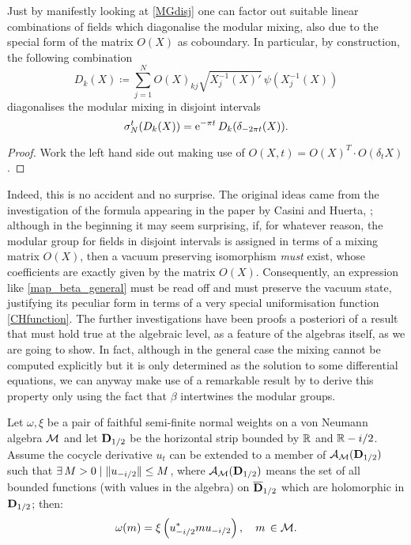 \begin{property}
Just by manifestly looking at \eqref{MGdisj} one can 
factor out suitable linear combinations of fields which 
diagonalise the modular mixing, also due to the special 
form of the matrix $O(X)$ as coboundary. In particular,
by construction, the following combination
\[
D_k(X)\coloneqq \sum_{j=1}^N O(X)_{kj}\sqrt{X_j^{-1}(X)'}\,
\psi(X_j^{-1}(X))
\]
diagonalises the modular mixing in disjoint intervals
\[
\sigma_N^t(D_k(X))=\operatorname{e}^{-\pi t}D_k(\delta_{-2\pi t}(X)).
\]
\end{property}
\begin{proof}
Work the left hand side out making use of 
$O(X,t)=O(X)^T\cdot O(\delta_t X)$.\qedhere
\end{proof}
Indeed, this is no accident and no surprise. The original 
ideas came from the investigation of the formula appearing
in the paper by Casini and Huerta, \cite{CH:2009}; 
although in the beginning it 
may seem surprising, if, for whatever reason, the modular 
group for fields in disjoint intervals is assigned in terms 
of a mixing matrix $O(X)$, then a vacuum preserving 
isomorphism \emph{must} exist, whose coefficients are exactly
given by the matrix $O(X)$. Consequently, an expression like 
\eqref{map_beta_general} must be read off and must preserve the 
vacuum state, justifying its peculiar form in terms of a 
very special uniformisation function \eqref{CHfunction}.
The further investigations have been proofs a posteriori of 
a result that must hold true at the algebraic level, as 
a feature of the algebras itself, as we are going to show.
In fact, although in the general case the mixing
cannot be computed explicitly but it is only determined as 
the solution to some differential equations, we can anyway 
make use of a remarkable result by 
\cite*{TAKII:2002} to derive this property only using the fact 
that $\beta$ intertwines the modular groups.
\begin{theorem}
\label{Tak3.17}
Let $\omega,\xi$ be a pair of faithful semi-finite normal weights 
on a von Neumann algebra $\mathcal{M}$ and let $\textrm{\bfseries{D}}_{1/2}$ 
be the horizontal strip bounded by $\mathbb{R}$ and $\mathbb{R}-i/2$.
Assume the cocycle derivative $u_t$ 
can be extended to a member of 
$\mathcal{A}_{\mathcal{M}}(\textrm{\bfseries{D}}_{1/2})$ 
such that $\exists\,M>0\mid \lVert u_{-i/2}\rVert\leq M$, where 
$\mathcal{A}_{\mathcal{M}}(\textrm{\bfseries{D}}_{1/2})$
means the set of all bounded functions (with values
in the algebra) on 
$\overline{\textrm{\bfseries{D}}}_{1/2}$ which
are holomorphic in $\textrm{\bfseries{D}}_{1/2}$; then: 
\[
\omega(m)=\xi\left(u^*_{-i/2} m u_{-i/2}\right),\quad m\,\in\mathcal{M}.
\]
\end{theorem}
